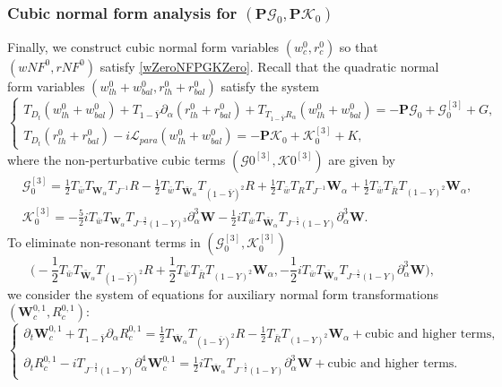 \documentclass[10pt]{amsart}
\theoremstyle{remark}
\theoremstyle{definition}
\numberwithin{equation}{section}
\newcommand{\p}{\partial}
\newcommand{\al}{\alpha}
\newcommand{\f}{\frac}
\newcommand{\bw}{\mathbf{W}}
\newcommand{\nP}{{\mathbf P}}
\begin{document}
\subsubsection{Cubic normal form analysis for $(\nP\mathcal{G}_0, \nP\mathcal{K}_0)$}
Finally, we construct cubic normal form variables $(w^0_c, r^0_c)$ so that $(w{NF}^0, r{NF}^0)$ satisfy \eqref{wZeroNFPGKZero}. Recall that the quadratic normal form variables $(w^0_{lh}+w^0_{bal}, r^0_{lh}+ r^0_{bal})$ satisfy the system
\begin{equation*} 
\begin{cases}
T_{D_t}(w^0_{lh}+w^0_{bal})+T_{1-\bar{Y}}\p_\al (r^0_{lh}+r^0_{bal})+T_{T_{1-\bar{Y}}R_{\al}}(w^0_{lh}+w^0_{bal})= -\nP \mathcal{G}_0 + \mathcal{G}_0^{[3]} + G,\\
T_{D_t}(r^0_{lh}+r^0_{bal})-i\mathcal{L}_{para}(w^0_{lh}+w^0_{bal})=- \nP \mathcal{K}_0 + \mathcal{K}_0^{[3]} +K,
\end{cases}
\end{equation*}
where the non-perturbative cubic terms $(\mathcal{G}0^{[3]}, \mathcal{K}0^{[3]})$ are given by
\begin{align*}
 &\mathcal{G}_0^{[3]} = \f12 T_{\bar{w}}T_{\bw_\al}T_{J^{-1}}R - \f12 T_{\bar{w}}T_{\bar{\bw}_\al}T_{(1-\bar{Y})^2}R + \f12 T_{\bar{w}} T_R T_{J^{-1}}\bw_\al + \f12 T_{\bar{w}} T_{\bar{R}} T_{(1-Y)^2}\bw_\al,\\
  &\mathcal{K}_0^{[3]} = -\f52i T_{\bar{w}} T_{\bw_\al} T_{J^{-\f32}(1-Y)^3} \p_\al^3 \bw -\f12i T_{\bar{w}} T_{\bar{\bw}_\al} T_{J^{-\f52}(1-Y)}  \p_\al^3 \bw.
\end{align*}
To eliminate non-resonant terms in $(\mathcal{G}_0^{[3]}, \mathcal{K}_0^{[3]})$
\begin{equation*}
\Big(-\f12 T_{\bar{w}}T_{\bar{\bw}_\al}T_{(1-\bar{Y})^2}R + \f12 T_{\bar{w}} T_{\bar{R}} T_{(1-Y)^2}\bw_\al, -\f12i T_{\bar{w}} T_{\bar{\bw}_\al} T_{J^{-\f52}(1-Y)}  \p_\al^3 \bw \Big), 
\end{equation*} 
we consider the system of equations for auxiliary normal form transformations $(\bw^{0,1}_c, R^{0,1}_c)$:
\begin{equation*}  
\begin{cases}
\p_t \bw^{0,1}_c+T_{1-\bar{Y}}\p_\al R^{0,1}_c=\f12 T_{\bar{\bw}_\al}T_{(1-\bar{Y})^2}R -\f12  T_{\bar{R}} T_{(1-Y)^2}\bw_\al + \text{cubic and higher terms},\\
\p_t R^{0,1}_c-iT_{J^{-\f32}(1-Y)}\p_\al^4\bw^{0,1}_c= \f12iT_{\bar{\bw}_\al} T_{J^{-\f52}(1-Y)}  \p_\al^3 \bw  + \text{cubic and higher terms}.
\end{cases}
\end{equation*}
\end{document}
